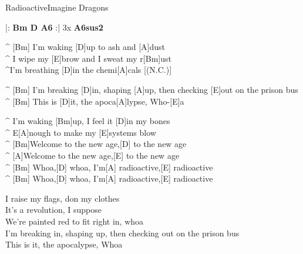 \begin{song}{Radioactive}{Imagine Dragons }

\vspace{3mm}
\begin{guitar}
|: \textbf{Bm  D  A6} :| 3x \textbf{A6sus2}\\
\end{guitar}

\vspace{3mm}
\begin{guitar}
^ [Bm]  I'm waking [D]up to ash and [A]dust\\
^ I wipe my [E]brow and I sweat my r[Bm]ust\\
^I'm breathing [D]in the chemi[A]cals [(N.C.)]\\
\end{guitar}


\vspace{3mm}
\begin{guitar}
^ [Bm]  I'm breaking [D]in, shaping [A]up, then checking [E]out on the prison bus\\
^ [Bm]  This is [D]it, the apoca[A]lypse, Who-[E]a\\
\end{guitar}


\vspace{3mm}
\begin{guitar}
^ I'm waking [Bm]up, I feel it [D]in my bones\\
^ E[A]nough to make my [E]systems blow\\
^ [Bm]Welcome to the new age,[D] to the new age\\
^ [A]Welcome to the new age,[E] to the new age\\
^ [Bm]  Whoa,[D] whoa, I'm[A] radioactive,[E] radioactive\\
^ [Bm]  Whoa,[D] whoa, I'm[A] radioactive,[E] radioactive\\
\end{guitar}


\vspace{3mm}
\begin{guitar}
I raise my flags, don my clothes\\
It's a revolution, I suppose\\
We're painted red to fit right in, whoa\\
I'm breaking in, shaping up, then checking out on the prison bus\\
This is it, the apocalypse, Whoa\\
\end{guitar}


\end{song}
